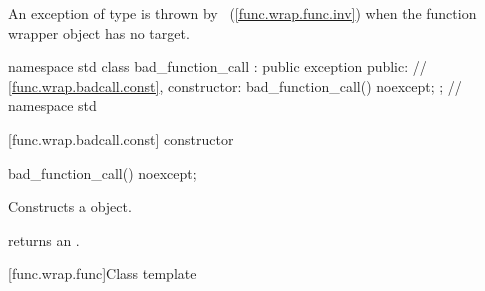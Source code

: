\pnum
An exception of type  is thrown by
~(\ref{func.wrap.func.inv})
when the function wrapper object has no target.

\begin{codeblock}
namespace std {
  class bad_function_call : public exception {
  public:
    // \ref{func.wrap.badcall.const}, constructor:
    bad_function_call() noexcept;
  };
} // namespace std
\end{codeblock}

[func.wrap.badcall.const]{ constructor}

%
%
\begin{itemdecl}
bad_function_call() noexcept;
\end{itemdecl}

\begin{itemdescr}
\pnum\effects Constructs a  object.
\end{itemdescr}

\begin{itemdescr}
\pnum\postcondition  {} returns an
 \ntbs.
\end{itemdescr}

[func.wrap.func]{Class template }
%

